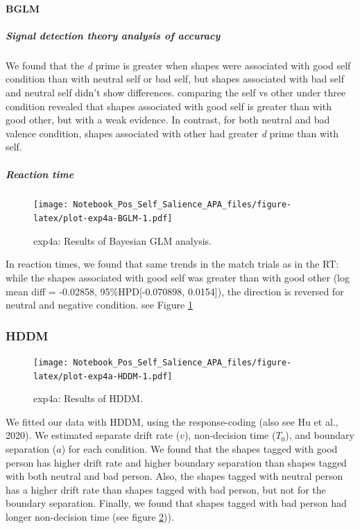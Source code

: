 \documentclass[
  english,
  man]{apa6}
\let\oldparagraph\paragraph
\renewcommand{\paragraph}[1]{\oldparagraph{#1}\mbox{}}
\let\oldsubparagraph\subparagraph
\renewcommand{\subparagraph}[1]{\oldsubparagraph{#1}\mbox{}}
\begin{document}
\hypertarget{bglm-5}{%
\paragraph{BGLM}\label{bglm-5}}

\hypertarget{signal-detection-theory-analysis-of-accuracy-7}{%
\subparagraph{Signal detection theory analysis of accuracy}\label{signal-detection-theory-analysis-of-accuracy-7}}

We found that the \emph{d} prime is greater when shapes were associated with good self condition than with neutral self or bad self, but shapes associated with bad self and neutral self didn't show differences. comparing the self vs other under three condition revealed that shapes associated with good self is greater than with good other, but with a weak evidence. In contrast, for both neutral and bad valence condition, shapes associated with other had greater \emph{d} prime than with self.

\hypertarget{reaction-time-11}{%
\subparagraph{Reaction time}\label{reaction-time-11}}

\begin{figure}
\centering
\texttt{[image: Notebook\_Pos\_Self\_Salience\_APA\_files/figure-latex/plot-exp4a-BGLM-1.pdf]}
\caption{\label{fig:plot-exp4a-BGLM}exp4a: Results of Bayesian GLM analysis.}
\end{figure}

In reaction times, we found that same trends in the match trials as in the RT: while the shapes associated with good self was greater than with good other (log mean diff = -0.02858, 95\%HPD{[}-0.070898, 0.0154{]}), the direction is reversed for neutral and negative condition. see Figure \ref{fig:plot-exp4a-BGLM}

\hypertarget{hddm-7}{%
\subsubsection{HDDM}\label{hddm-7}}

\begin{figure}
\centering
\texttt{[image: Notebook\_Pos\_Self\_Salience\_APA\_files/figure-latex/plot-exp4a-HDDM-1.pdf]}
\caption{\label{fig:plot-exp4a-HDDM}exp4a: Results of HDDM.}
\end{figure}

We fitted our data with HDDM, using the response-coding (also see Hu et al., 2020). We estimated separate drift rate (\(v\)), non-decision time (\(T_{0}\)), and boundary separation (\(a\)) for each condition. We found that the shapes tagged with good person has higher drift rate and higher boundary separation than shapes tagged with both neutral and bad person. Also, the shapes tagged with neutral person has a higher drift rate than shapes tagged with bad person, but not for the boundary separation. Finally, we found that shapes tagged with bad person had longer non-decision time (see figure \ref{fig:plot-exp4a-HDDM})).
\end{document}
